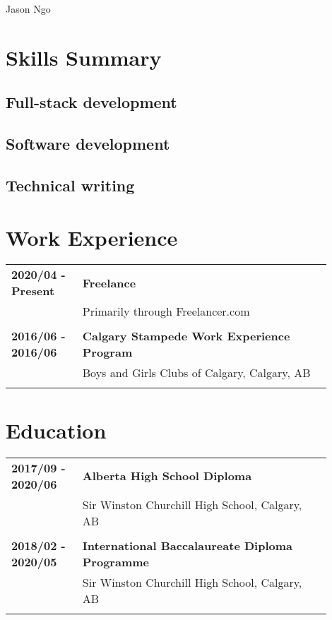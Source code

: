 \documentclass[letterpaper]{article}
\begin{document}
    \begin{center}
        \Large
        Jason Ngo

        \normalsize
        \noindent{\rule{\linewidth}{0.4pt}}
    \end{center}

    \section*{Skills Summary}
        \subsection*{Full-stack development}
        \subsection*{Software development}
        \subsection*{Technical writing}

    \section*{Work Experience}
        \begin{tabular}{p{0.2\linewidth}p{0.7\linewidth}} 
            \textbf{2020/04 - Present} & \large\textbf{Freelance} \\
            & Primarily through Freelancer.com \\
            \\
            \textbf{2016/06 - 2016/06} & \large\textbf{Calgary Stampede Work Experience Program} \\
            & Boys and Girls Clubs of Calgary, Calgary, AB \\
            \\
        \end{tabular}

    \section*{Education}
        \begin{tabular}{p{0.2\linewidth}p{0.7\linewidth}} 
            \textbf{2017/09 - 2020/06} & \large\textbf{Alberta High School Diploma} \\
            & Sir Winston Churchill High School, Calgary, AB \\
            \\
            \textbf{2018/02 - 2020/05} & \large\textbf{International Baccalaureate Diploma Programme} \\
            & Sir Winston Churchill High School, Calgary, AB \\
            \\
        \end{tabular}
\end{document}

